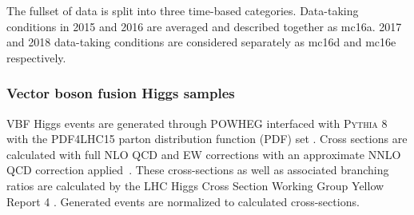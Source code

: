 

The fullset of data is split into three time-based categories. Data-taking conditions in 2015 and 2016 are averaged and described together as mc16a. 2017 and 2018 data-taking conditions are considered separately as mc16d and mc16e respectively. 

\subsubsection{Vector boson fusion Higgs samples}

VBF Higgs events are generated through \textsc{POWHEG} \cite{Nason:2009ai} interfaced with \textsc{Pythia} 8 with the PDF4LHC15 parton distribution function (PDF) set \cite{PDF4LHC15}. Cross sections are calculated with full NLO QCD and EW corrections \cite{CiccoliniDennerDittmaier2007,Arnold2009} with an approximate NNLO QCD correction applied~\cite{Bolzoni2010}. These cross-sections as well as associated branching ratios are calculated by the LHC Higgs Cross Section Working Group Yellow Report 4 \cite{deFlorian:2016spz}. Generated events are normalized to calculated cross-sections. %
